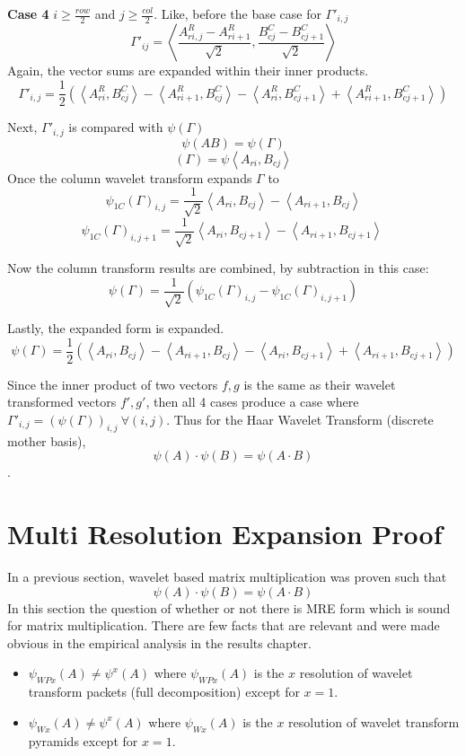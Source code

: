  \textbf{Case 4} $i \ge \frac {row}{2}$ and $j \ge \frac{col}{2}$.
Like, before the base case for $\Gamma'_{i,j}$ 
\[ \Gamma'_{ij} = \left\langle \frac {A^R_{ri,j} - A^R_{ri+1}}{\sqrt{2}} , \frac {B^C_{cj} - B^C_{cj + 1}}{\sqrt{2}} \right\rangle  \]
Again, the vector sums are expanded within their inner products. 
\[ \Gamma'_{i,j} = \frac{1}{2} ( \left\langle A^R_{ri}, B^C_{cj}   \right\rangle -   \left\langle A^R_{ri+1}, B^C_{cj}   \right\rangle -  \left\langle A^R_{ri}, B^C_{cj + 1}   \right\rangle +  \left\langle A^R_{ri+1}, B^C_{cj+1}   \right\rangle    ) \]

Next, $\Gamma'_{i,j}$ is compared with $\psi(\Gamma)$
\[ \psi (A B)  = \psi (\Gamma)    \]
\[ (\Gamma) = \psi  \left\langle A_{ri} , B_{cj}  \right\rangle \]
Once the column wavelet transform expands $\Gamma$ to
\[ \psi_{1C} (\Gamma)_{i,j} = \frac{1}{\sqrt{2}} \left\langle A_{ri} , B_{cj}  \right\rangle - \left\langle A_{ri +1} , B_{cj}  \right\rangle   \]
\[ \psi_{1C} (\Gamma)_{i,j+1} = \frac{1}{\sqrt{2}} \left\langle A_{ri} , B_{cj+1}  \right\rangle - \left\langle A_{ri +1} , B_{cj+1}  \right\rangle \  \]

Now the column transform results are combined, by subtraction in this case:
\[ \psi(\Gamma) = \frac{1}{\sqrt {2}} (\psi_{1C} (\Gamma)_{i,j} - \psi_{1C} (\Gamma)_{i,j+1}   ) \]

Lastly, the expanded form is expanded.
\[ \psi(\Gamma) = \frac{1}{2} (  \left\langle A_{ri} , B_{cj}  \right\rangle - \left\langle A_{ri +1} , B_{cj}  \right\rangle - \left\langle A_{ri} , B_{cj+1}  \right\rangle + \left\langle A_{ri +1} , B_{cj+1}  \right\rangle   ) \]

Since the inner product of two vectors $f,g$ is the same as their wavelet transformed vectors $f',g'$, then all 4 cases produce a case where $\Gamma'_{i,j} = (\psi (\Gamma))_{i,j} \ \forall (i,j)$.  Thus for the Haar Wavelet Transform (discrete mother basis), 
\[ \psi (A) \cdot \psi(B) = \psi (A\cdot B) \].

\section {Multi Resolution Expansion Proof}
In a previous section, wavelet based matrix multiplication was proven such that
\[\psi(A) \cdot \psi(B) = \psi (A\cdot B) \]
In this section the question of whether or not there is MRE form which is sound for matrix multiplication.  There are few facts that are relevant and were made obvious in the empirical analysis in the results %
chapter.  
\begin{itemize}
\item $\psi_{WPx} (A) \not= \psi^x(A) $  where $\psi_{WPx} (A) $ is the $x$ resolution of wavelet transform packets (full decomposition) except for $x=1$.
\item $\psi_{Wx} (A) \not= \psi^x(A) $  where $\psi_{Wx} (A) $ is the $x$ resolution of wavelet transform pyramids except for $x=1$.
\end{itemize}

